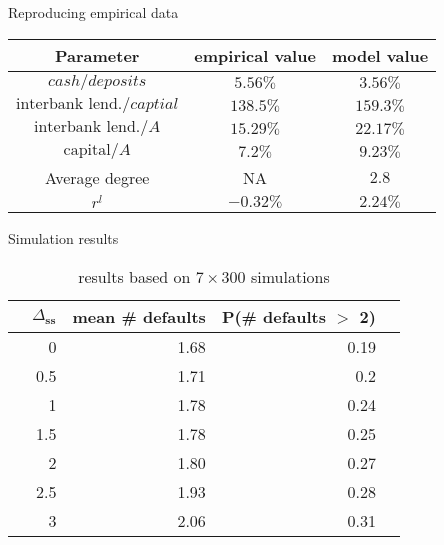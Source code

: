 \documentclass{beamer}
\begin{document}
\begin{frame}{Reproducing empirical data}

 
\begin{table}
    \begin{center}
        \begin{tabular}{|c | c | c|} 
         \hline
         Parameter & empirical value  & model value\\ [0.3ex] 
         \hline\hline
         $cash / deposits$ & $5.56\%$ &  $3.56\%$ \\ 
         \hline
         $\text{interbank lend.} / captial$ & $138.5\%$ &  $159.3\%$ \\
         \hline
         $\text{interbank lend.} / A$ & $15.29\%$ &  $22.17\%$ \\
         \hline
         $\text{capital} / A$ & $7.2\%$ &  $9.23\%$ \\
         \hline
         Average degree & NA & $2.8$ \\
         \hline
         $r^l$ & $-0.32\%$ & $2.24\%$ \\  [1ex] 
         \hline
        \end{tabular}
    \end{center}
\end{table}
    
\end{frame}

\begin{frame}{Simulation results}
    
\begin{table}[ht]
    \centering
    \begin{tabular}{rrrrr}
      \hline
     & $\Delta_{\textbf{ss}}$ & mean \# defaults &  P(\# defaults $>$ 2) \\ 
      \hline
   & 0 & 1.68 & 0.19\\ 
   & 0.5 & 1.71 & 0.2\\ 
   & 1 & 1.78 & 0.24\\ 
   & 1.5 & 1.78 & 0.25\\ 
   & 2 & 1.80 & 0.27 \\ 
   & 2.5 & 1.93 & 0.28\\ 
   & 3 & 2.06 & 0.31\\ 
       \hline
    \end{tabular}
    \caption{results based on $7 \times 300$ simulations}
  \end{table}
  
\end{frame}
\end{document}
